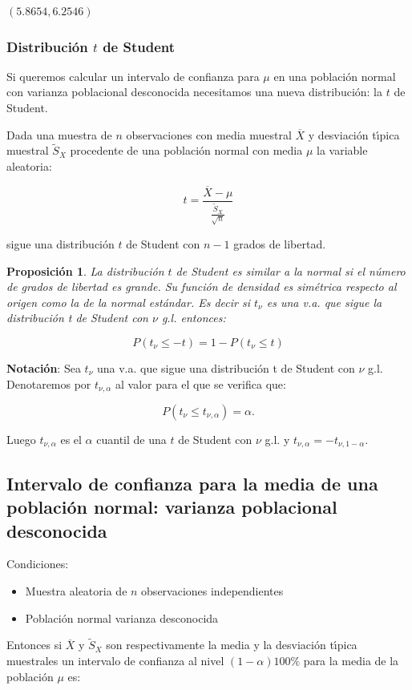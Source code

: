 \documentclass[12pt]{report}
\newtheorem{proposition}[definition]{Proposici\'on}
\begin{document}
    $\left(5.8654, 6.2546\right)$


       \subsubsection{Distribuci\'on $t$ de Student}

       Si queremos calcular  un intervalo de
       confianza para $\mu$
       en una poblaci\'on  normal con
        varianza poblacional  desconocida
        necesitamos una nueva
      distribuci\'on: la $t$ de Student.

       Dada una muestra de $n$ observaciones con media muestral $\overline{X}$ y
       desviaci\'on t\'{\i}pica muestral $\tilde{S}_{X}$ procedente de una poblaci\'on
       normal con media $\mu$  la variable aleatoria:

       $$t=\frac{\overline{X}-\mu}{\frac{\tilde{S}_{X}}{\sqrt{n}}}$$

       sigue una distribuci\'on $t$ de Student con $n-1$ grados de libertad.

       \begin{proposition}

       La distribuci\'on $t$ de Student es similar a la normal si el
       n\'umero de grados de libertad es grande. Su funci\'on de densidad es
       sim\'etrica respecto al origen como la de la normal est\'andar.
       Es decir si $t_{\nu}$ es una v.a. que sigue la distribuci\'on
       t de Student con $\nu$ g.l. entonces:

       $$P(t_{\nu}\leq -t)=1-P(t_{\nu}\leq t)$$
\end{proposition}

        \textbf{Notaci\'on}:
        Sea $t_{\nu}$  una v.a. que sigue una distribuci\'on
       t de Student con $\nu$ g.l. Denotaremos por $t_{\nu,\alpha}$ al
           valor para el que se verifica que:

          $$P(t_{\nu}\leq t_{\nu,\alpha})=\alpha.$$



         Luego $t_{\nu,\alpha}$ es el $\alpha$ cuantil de una $t$ de
         Student con $\nu$ g.l. y  $t_{\nu,\alpha}=-t_{\nu,1-\alpha}.$

   \subsection{Intervalo de confianza para la media de una poblaci\'on normal:
        varianza poblacional desconocida}

        Condiciones:
        \begin{itemize}
        \item Muestra aleatoria de $n$ observaciones independientes
        \item Poblaci\'on normal varianza desconocida
        \end{itemize}
        Entonces si $\overline{X}$ y $\tilde{S}_{X}$ son respectivamente la media y
        la desviaci\'on t\'{\i}pica muestrales un intervalo de confianza al nivel
        $(1-\alpha)100\%$ para la media de la poblaci\'on $\mu$ es:
\end{document}
